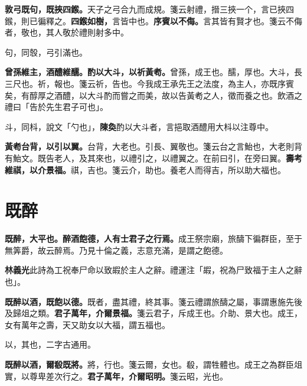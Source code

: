 \textbf{敦弓既句，既挾四鍭。}{\footnotesize 天子之弓合九而成規。箋云射禮，搢三挾一个，言已挾四鍭，則已徧釋之。}\textbf{四鍭如樹，}{\footnotesize 言皆中也。}\textbf{序賓以不侮。}{\footnotesize 言其皆有賢才也。箋云不侮者，敬也，其人敬於禮則射多中。}

\begin{quoting}句，同彀，弓引滿也。\end{quoting}

\textbf{曾孫維主，酒醴維醹。酌以大斗，以祈黃耇。}{\footnotesize 曾孫，成王也。醹，厚也。大斗，長三尺也。祈，報也。箋云祈，告也。今我成王承先王之法度，為主人，亦既序賓矣，有醇厚之酒醴，以大斗酌而嘗之而美，故以告黃耇之人，徵而養之也。飲酒之禮曰「告於先生君子可也」。}

\begin{quoting}斗，同枓，說文「勺也」，\textbf{陳奐}酌以大斗者，言挹取酒醴用大枓以注尊中。\end{quoting}

\textbf{黃耇台背，以引以翼。}{\footnotesize 台背，大老也。引長、翼敬也。箋云台之言鮐也，大老則背有鮐文。既告老人，及其來也，以禮引之，以禮翼之。在前曰引，在旁曰翼。}\textbf{壽考維祺，以介景福。}{\footnotesize 祺，吉也。箋云介，助也。養老人而得吉，所以助大福也。}

\section{既醉}


\textbf{既醉，大平也。醉酒飽德，人有士君子之行焉。}{\footnotesize 成王祭宗廟，旅醻下徧群臣，至于無筭爵，故云醉焉。乃見十倫之義，志意充滿，是謂之飽德。}

\begin{quoting}\textbf{林義光}此詩為工祝奉尸命以致嘏於主人之辭。禮運注「嘏，祝為尸致福于主人之辭也」。\end{quoting}

\textbf{既醉以酒，既飽以德。}{\footnotesize 既者，盡其禮，終其事。箋云禮謂旅醻之屬，事謂惠施先後及歸俎之類。}\textbf{君子萬年，介爾景福。}{\footnotesize 箋云君子，斥成王也。介助、景大也。成王，女有萬年之壽，天又助女以大福，謂五福也。}

\begin{quoting}以，其也，二字古通用。\end{quoting}

\textbf{既醉以酒，爾殽既將。}{\footnotesize 將，行也。箋云爾，女也。殽，謂牲體也。成王之為群臣俎實，以尊卑差次行之。}\textbf{君子萬年，介爾昭明。}{\footnotesize 箋云昭，光也。}

